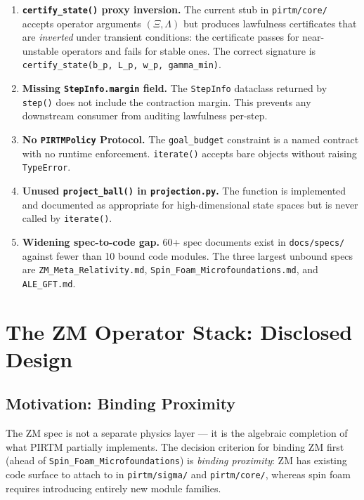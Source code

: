 \documentclass[12pt,letterpaper]{article}
\theoremstyle{definition}
\theoremstyle{remark}
\begin{document}
\begin{enumerate}[leftmargin=*]
  \item \textbf{\texttt{certify\_state()} proxy inversion.}
        The current stub in \texttt{pirtm/core/} accepts operator
        arguments $(\Xi, \Lambda)$ but produces lawfulness certificates that
        are \emph{inverted} under transient conditions: the certificate passes
        for near-unstable operators and fails for stable ones. The correct
        signature is \texttt{certify\_state(b\_p, L\_p, w\_p, gamma\_min)}.

  \item \textbf{Missing \texttt{StepInfo.margin} field.}
        The \texttt{StepInfo} dataclass returned by \texttt{step()} does not
        include the contraction margin. This prevents any downstream consumer
        from auditing lawfulness per-step.

  \item \textbf{No \texttt{PIRTMPolicy} Protocol.}
        The \texttt{goal\_budget} constraint is a named contract with no
        runtime enforcement. \texttt{iterate()} accepts bare objects without
        raising \texttt{TypeError}.

  \item \textbf{Unused \texttt{project\_ball()} in \texttt{projection.py}.}
        The function is implemented and documented as appropriate for
        high-dimensional state spaces but is never called by \texttt{iterate()}.

  \item \textbf{Widening spec-to-code gap.}
        60+ spec documents exist in \texttt{docs/specs/} against fewer than
        10 bound code modules. The three largest unbound specs are
        \texttt{ZM\_Meta\_Relativity.md},
        \texttt{Spin\_Foam\_Microfoundations.md}, and
        \texttt{ALE\_GFT.md}.
\end{enumerate}

\section{The ZM Operator Stack: Disclosed Design}
\label{sec:zm-stack}

\subsection{Motivation: Binding Proximity}

The ZM spec is not a separate physics layer --- it is the algebraic completion
of what PIRTM partially implements. The decision criterion for binding ZM first
(ahead of \texttt{Spin\_Foam\_Microfoundations}) is \emph{binding proximity}:
ZM has existing code surface to attach to in \texttt{pirtm/sigma/} and
\texttt{pirtm/core/}, whereas spin foam requires introducing entirely new
module families.
\end{document}
